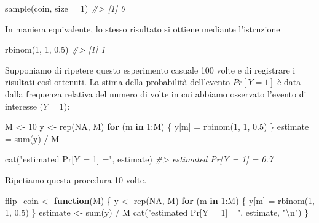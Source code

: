 \documentclass[
  10pt,
  italian,
  a4paper,
  extrafontsizes,onecolumn,openright
  ]{memoir}
\newenvironment{Shaded}{\begin{snugshade}}{\end{snugshade}}
\newcommand{\AttributeTok}[1]{\textcolor[rgb]{0.77,0.63,0.00}{#1}}
\newcommand{\CommentTok}[1]{\textcolor[rgb]{0.56,0.35,0.01}{\textit{#1}}}
\newcommand{\ConstantTok}[1]{\textcolor[rgb]{0.00,0.00,0.00}{#1}}
\newcommand{\ControlFlowTok}[1]{\textcolor[rgb]{0.13,0.29,0.53}{\textbf{#1}}}
\newcommand{\DecValTok}[1]{\textcolor[rgb]{0.00,0.00,0.81}{#1}}
\newcommand{\FloatTok}[1]{\textcolor[rgb]{0.00,0.00,0.81}{#1}}
\newcommand{\FunctionTok}[1]{\textcolor[rgb]{0.00,0.00,0.00}{#1}}
\newcommand{\NormalTok}[1]{#1}
\newcommand{\OtherTok}[1]{\textcolor[rgb]{0.56,0.35,0.01}{#1}}
\newcommand{\SpecialCharTok}[1]{\textcolor[rgb]{0.00,0.00,0.00}{#1}}
\newcommand{\StringTok}[1]{\textcolor[rgb]{0.31,0.60,0.02}{#1}}
\theoremstyle{definition}
\theoremstyle{definition}
\theoremstyle{definition}
\theoremstyle{definition}
\theoremstyle{remark}
\begin{document}
\begin{Shaded}
\begin{Highlighting}[]
\FunctionTok{sample}\NormalTok{(coin, }\AttributeTok{size =} \DecValTok{1}\NormalTok{)}
\CommentTok{\#\textgreater{} [1] 0}
\end{Highlighting}
\end{Shaded}

\noindent
In maniera equivalente, lo stesso risultato si ottiene mediante l'istruzione

\begin{Shaded}
\begin{Highlighting}[]
\FunctionTok{rbinom}\NormalTok{(}\DecValTok{1}\NormalTok{, }\DecValTok{1}\NormalTok{, }\FloatTok{0.5}\NormalTok{)}
\CommentTok{\#\textgreater{} [1] 1}
\end{Highlighting}
\end{Shaded}

Supponiamo di ripetere questo esperimento casuale 100 volte e di registrare i risultati così ottenuti. La stima della probabilità dell'evento \(Pr[Y = 1]\) è data dalla frequenza relativa del numero di volte in cui abbiamo osservato l'evento di interesse (\(Y = 1\)):

\begin{Shaded}
\begin{Highlighting}[]
\NormalTok{M }\OtherTok{\textless{}{-}} \DecValTok{10}
\NormalTok{y }\OtherTok{\textless{}{-}} \FunctionTok{rep}\NormalTok{(}\ConstantTok{NA}\NormalTok{, M)}
\ControlFlowTok{for}\NormalTok{ (m }\ControlFlowTok{in} \DecValTok{1}\SpecialCharTok{:}\NormalTok{M) \{}
\NormalTok{  y[m] }\OtherTok{=} \FunctionTok{rbinom}\NormalTok{(}\DecValTok{1}\NormalTok{, }\DecValTok{1}\NormalTok{, }\FloatTok{0.5}\NormalTok{)}
\NormalTok{\}}
\NormalTok{estimate }\OtherTok{=} \FunctionTok{sum}\NormalTok{(y) }\SpecialCharTok{/}\NormalTok{ M}

\FunctionTok{cat}\NormalTok{(}\StringTok{"estimated Pr[Y = 1] ="}\NormalTok{, estimate)}
\CommentTok{\#\textgreater{} estimated Pr[Y = 1] = 0.7}
\end{Highlighting}
\end{Shaded}

\noindent
Ripetiamo questa procedura 10 volte.

\begin{Shaded}
\begin{Highlighting}[]
\NormalTok{flip\_coin }\OtherTok{\textless{}{-}} \ControlFlowTok{function}\NormalTok{(M) \{}
\NormalTok{  y }\OtherTok{\textless{}{-}} \FunctionTok{rep}\NormalTok{(}\ConstantTok{NA}\NormalTok{, M)}
  \ControlFlowTok{for}\NormalTok{ (m }\ControlFlowTok{in} \DecValTok{1}\SpecialCharTok{:}\NormalTok{M) \{}
\NormalTok{    y[m] }\OtherTok{=} \FunctionTok{rbinom}\NormalTok{(}\DecValTok{1}\NormalTok{, }\DecValTok{1}\NormalTok{, }\FloatTok{0.5}\NormalTok{)}
\NormalTok{  \}}
\NormalTok{  estimate }\OtherTok{\textless{}{-}} \FunctionTok{sum}\NormalTok{(y) }\SpecialCharTok{/}\NormalTok{ M}
  \FunctionTok{cat}\NormalTok{(}\StringTok{"estimated Pr[Y = 1] ="}\NormalTok{, estimate, }\StringTok{"}\SpecialCharTok{\textbackslash{}n}\StringTok{"}\NormalTok{)}
\NormalTok{\}}
\end{Highlighting}
\end{Shaded}
\end{document}

